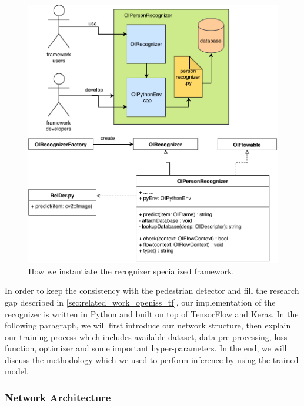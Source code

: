 \begin{figure}
    \centering
    \includegraphics[scale=0.8]{figures/framework_inst_recognizer.pdf}
    \caption{How we instantiate the recognizer specialized framework.}
    \label{fig:fw-inst-recognizer}
\end{figure}

In order to keep the consistency with the pedestrian detector and fill the
research gap described in \autoref{sec:related_work_openiss_tf}, our implementation
of the recognizer is written in Python and built on top of TensorFlow and
Keras.
In the following paragraph, we will first introduce our network structure, then
explain our training process which includes available dataset, data
pre-processing, loss function,  optimizer and some important hyper-parameters.
In the end, we will discuss the methodology which we used to perform inference
by using the trained model.

\subsubsection{Network Architecture}
\label{fw-recognizer-spec-network-arch}


